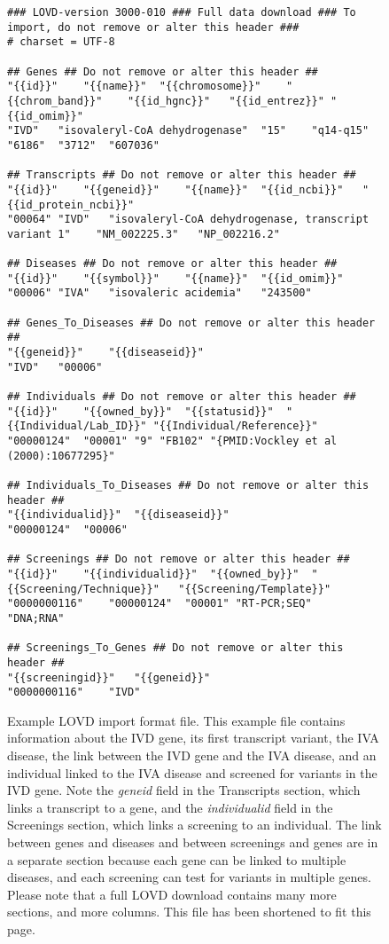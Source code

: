 \documentclass[a4paper,oneside,openany,12pt]{memoir}
\begin{document}
\begin{figure}[ht]
  \begin{shaded}
    \scriptsize
    \begin{verbatim}
### LOVD-version 3000-010 ### Full data download ### To import, do not remove or alter this header ###
# charset = UTF-8

## Genes ## Do not remove or alter this header ##
"{{id}}"	"{{name}}"	"{{chromosome}}"	"{{chrom_band}}"	"{{id_hgnc}}"	"{{id_entrez}}"	"{{id_omim}}"
"IVD"	"isovaleryl-CoA dehydrogenase"	"15"	"q14-q15"	"6186"	"3712"	"607036"

## Transcripts ## Do not remove or alter this header ##
"{{id}}"	"{{geneid}}"	"{{name}}"	"{{id_ncbi}}"	"{{id_protein_ncbi}}"
"00064"	"IVD"	"isovaleryl-CoA dehydrogenase, transcript variant 1"	"NM_002225.3"	"NP_002216.2"

## Diseases ## Do not remove or alter this header ##
"{{id}}"	"{{symbol}}"	"{{name}}"	"{{id_omim}}"
"00006"	"IVA"	"isovaleric acidemia"	"243500"

## Genes_To_Diseases ## Do not remove or alter this header ##
"{{geneid}}"	"{{diseaseid}}"
"IVD"	"00006"

## Individuals ## Do not remove or alter this header ##
"{{id}}"	"{{owned_by}}"	"{{statusid}}"	"{{Individual/Lab_ID}}"	"{{Individual/Reference}}"
"00000124"	"00001"	"9"	"FB102"	"{PMID:Vockley et al (2000):10677295}"

## Individuals_To_Diseases ## Do not remove or alter this header ##
"{{individualid}}"	"{{diseaseid}}"
"00000124"	"00006"

## Screenings ## Do not remove or alter this header ##
"{{id}}"	"{{individualid}}"	"{{owned_by}}"	"{{Screening/Technique}}"	"{{Screening/Template}}"
"0000000116"	"00000124"	"00001"	"RT-PCR;SEQ"	"DNA;RNA"

## Screenings_To_Genes ## Do not remove or alter this header ##
"{{screeningid}}"	"{{geneid}}"
"0000000116"	"IVD"
    \end{verbatim}
  \caption{%
    Example LOVD import format file.
    This example file contains information about the IVD gene, its first transcript variant, the IVA disease, the link between the IVD gene and the IVA disease,
     and an individual linked to the IVA disease and screened for variants in the IVD gene.
    Note the \emph{geneid} field in the Transcripts section, which links a transcript to a gene, and the \emph{individualid} field in the Screenings section, which links a screening to an individual.
    The link between genes and diseases and between screenings and genes are in a separate section because
     each gene can be linked to multiple diseases, and each screening can test for variants in multiple genes.
    Please note that a full LOVD download contains many more sections, and more columns.
    This file has been shortened to fit this page.}
  \end{shaded}
\end{figure}
\end{document}
